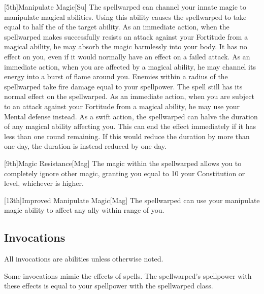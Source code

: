         [5th]{Manipulate Magic}[Su]
        The spellwarped can channel your innate magic to manipulate magical abilities.
        Using this ability causes the spellwarped to take  equal to half the  of the target ability.
        As an immediate action, when the spellwarped makes successfully resists an attack against your Fortitude from a magical ability, he may absorb the magic harmlessly into your body.
        It has no effect on you, even if it would normally have an effect on a failed attack.
        As an immediate action, when you are affected by a magical ability, he may channel its energy into a burst of flame around you.
        Enemies within a \areamed radius of the spellwarped take fire damage equal to your spellpower.
        The spell still has its normal effect on the spellwarped.
        As an immediate action, when you are subject to an attack against your Fortitude from a magical ability, he may use your Mental defense instead.
        As a swift action, the spellwarped can halve the duration of any magical ability affecting you.
        This can end the effect immediately if it has less than one round remaining.
        If this would reduce the duration by more than one day, the duration is instead reduced by one day.

        [9th]{Magic Resistance}[Mag]
        The magic within the spellwarped allows you to completely ignore other magic, granting you  equal to 10 \add your Constitution or level, whichever is higher.

        [13th]{Improved Manipulate Magic}[Mag]
        The spellwarped can use your manipulate magic ability to affect any ally within \rngmed range of you.

    \subsection{Invocations}\label{Invocations}

        All invocations are  abilities unless otherwise noted.

        Some invocations mimic the effects of spells.
        The spellwarped's spellpower with these effects is equal to your spellpower with the spellwarped class.

